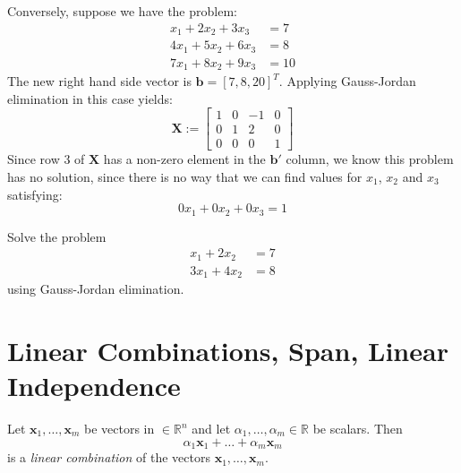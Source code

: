 \begin{example}
Conversely, suppose we have the problem:
\begin{displaymath}
\begin{aligned}
x_1 + 2x_2 + 3x_3 & = 7\\
4x_1 + 5x_2 + 6x_3 & = 8\\
7x_1 + 8x_2 + 9x_3 & =10
\end{aligned}
\end{displaymath}
The new right hand side vector is $\mathbf{b} = [7, 8, 20]^T$. Applying Gauss-Jordan elimination in this case yields:
\begin{equation}
\mathbf{X} :=
\left[
\begin{array}{ccc|c}
1 & 0 & -1 & 0\\
0 & 1 & 2 & 0\\
0 & 0 & 0 & 1
\end{array}
\right]
\label{eqn:RowEchelon2}
\end{equation}
Since row 3 of $\mathbf{X}$ has a non-zero element in the $\mathbf{b}'$ column, we know this problem has no solution, since there is no way that we can find values for $x_1$, $x_2$ and $x_3$ satisfying:
\begin{equation}
0x_1 + 0x_2 + 0x_3 = 1
\end{equation}
\end{example}

\begin{exercise}
Solve the problem
\begin{displaymath}
\begin{aligned}
x_1 + 2x_2 & = 7\\
3x_1 + 4x_2 & = 8
\end{aligned}
\end{displaymath}
using Gauss-Jordan elimination.
\end{exercise}

\section{Linear Combinations, Span, Linear Independence}
\begin{definition} Let $\mathbf{x}_1,\dots,\mathbf{x}_m$ be vectors in $\in \mathbb{R}^n$ and let $\alpha_1,\dots,\alpha_m \in \mathbb{R}$ be scalars. Then 
\begin{equation}
\alpha_1\mathbf{x}_1 + \dots + \alpha_m\mathbf{x}_m
\end{equation}
is a \textit{linear combination} of the vectors $\mathbf{x}_1,\dots,\mathbf{x}_m$.
\end{definition}

